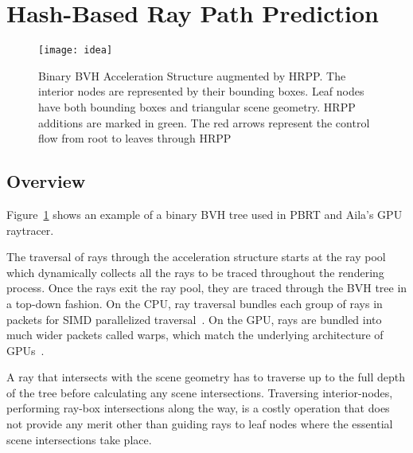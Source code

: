 \section{Hash-Based Ray Path Prediction}
\label{sec:HRPP_idea}

\begin{figure}[htb]
  \centering
  \texttt{[image: idea]}

\caption{\label{fig:idea}
           Binary BVH Acceleration Structure augmented by HRPP. The interior nodes are represented by their bounding boxes. Leaf nodes have both bounding boxes and triangular scene geometry. HRPP additions are marked in green. The red arrows represent the control flow from root to leaves through HRPP}
\end{figure}

\subsection{Overview}
Figure~\ref{fig:idea} shows an example of a binary BVH tree used in PBRT and Aila's GPU raytracer. 

The traversal of rays through the acceleration structure starts at the ray pool which dynamically collects all the rays to be traced throughout the rendering process. Once the rays exit the ray pool, they are traced through the BVH tree in a top-down fashion. On the CPU, ray traversal bundles each group of rays in packets for SIMD parallelized traversal~\cite{Wald07simdray}. On the GPU, rays are bundled into much wider packets called warps, which match the underlying architecture of GPUs~\cite{Aila:2010:ACT:1921479.1921497}.

A ray that intersects with the scene geometry has to traverse up to the full depth of the tree before calculating any scene intersections. Traversing interior-nodes, performing ray-box intersections along the way, is a costly operation that does not provide any merit other than guiding rays to leaf nodes where the essential scene intersections take place.

